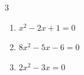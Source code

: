 \begin{multicols}{3}
\begin{enumerate}

  \item $x^{2}-2x+1=0$

        \phantom{$\displaystyle x=1$}

  \item $8x^{2}-5x-6=0$


  \item $2x^{2}-3x=0$


\end{enumerate}
\end{multicols}

\newpage
\resetdrill

